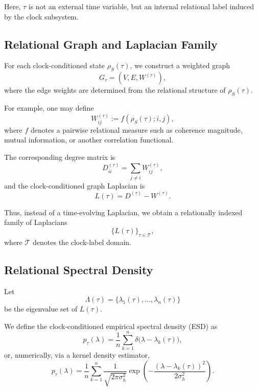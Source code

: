 \documentclass[11pt,a4paper]{article}
\theoremstyle{definition}
\theoremstyle{remark}
\begin{document}
Here, $\tau$ is not an external time variable, but an internal relational label induced by the
clock subsystem.

\subsection{Relational Graph and Laplacian Family}

For each clock-conditioned state $\rho_S(\tau)$, we construct a weighted graph
\begin{equation}
  G_{\tau} = (V, E, W^{(\tau)}),
\end{equation}
where the edge weights are determined from the relational structure of $\rho_S(\tau)$.

For example, one may define
\begin{equation}
  W^{(\tau)}_{ij} := f\!\left(\rho_S(\tau); i,j\right),
\end{equation}
where $f$ denotes a pairwise relational measure such as coherence magnitude, mutual
information, or another correlation functional.

The corresponding degree matrix is
\begin{equation}
  D^{(\tau)}_{ii} = \sum_{j \neq i} W^{(\tau)}_{ij},
\end{equation}
and the clock-conditioned graph Laplacian is
\begin{equation}
  L(\tau) = D^{(\tau)} - W^{(\tau)}.
\end{equation}

Thus, instead of a time-evolving Laplacian, we obtain a relationally indexed family of
Laplacians
\begin{equation}
  \{L(\tau)\}_{\tau \in \mathcal{T}},
\end{equation}
where $\mathcal{T}$ denotes the clock-label domain.

\subsection{Relational Spectral Density}

Let
\begin{equation}
  \Lambda(\tau) = \{\lambda_1(\tau), \dots, \lambda_n(\tau)\}
\end{equation}
be the eigenvalue set of $L(\tau)$.

We define the clock-conditioned empirical spectral density (ESD) as
\begin{equation}
  p_{\tau}(\lambda)
    = \frac{1}{n} \sum_{k=1}^{n} \delta\!\bigl(\lambda - \lambda_k(\tau)\bigr),
\end{equation}
or, numerically, via a kernel density estimator,
\begin{equation}
  p_{\tau}(\lambda)
    = \frac{1}{n} \sum_{k=1}^{n}
      \frac{1}{\sqrt{2\pi \sigma_h^2}}
      \exp\!\left(-\frac{(\lambda-\lambda_k(\tau))^2}{2\sigma_h^2}\right).
\end{equation}
\end{document}
